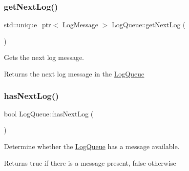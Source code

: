 \subsubsection{\texorpdfstring{get\+Next\+Log()}{getNextLog()}}
{\footnotesize\ttfamily std\+::unique\+\_\+ptr$<$ \hyperlink{class_aws_1_1_iot_1_1_device_client_1_1_logging_1_1_log_message}{Log\+Message} $>$ Log\+Queue\+::get\+Next\+Log (\begin{DoxyParamCaption}{ }\end{DoxyParamCaption})}



Gets the next log message. 

\begin{DoxyReturn}{Returns}
the next log message in the \hyperlink{class_aws_1_1_iot_1_1_device_client_1_1_logging_1_1_log_queue}{Log\+Queue} 
\end{DoxyReturn}
\mbox{\label{class_aws_1_1_iot_1_1_device_client_1_1_logging_1_1_log_queue_a400cd1c4ec72d56c544d32a49be15012}} 
\subsubsection{\texorpdfstring{has\+Next\+Log()}{hasNextLog()}}
{\footnotesize\ttfamily bool Log\+Queue\+::has\+Next\+Log (\begin{DoxyParamCaption}{ }\end{DoxyParamCaption})}



Determine whether the \hyperlink{class_aws_1_1_iot_1_1_device_client_1_1_logging_1_1_log_queue}{Log\+Queue} has a message available. 

\begin{DoxyReturn}{Returns}
true if there is a message present, false otherwise 
\end{DoxyReturn}
\mbox{\label{class_aws_1_1_iot_1_1_device_client_1_1_logging_1_1_log_queue_a09549fcdba5c73d9005909e24060affe}} 
